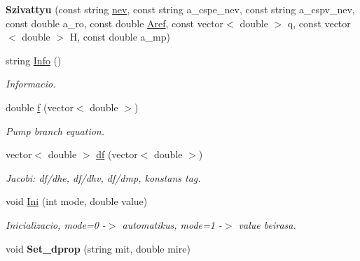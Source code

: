 \begin{DoxyCompactItemize}
\item 
\hypertarget{class_szivattyu_aea7d1a77b34e471145a856483915369f}{}\label{class_szivattyu_aea7d1a77b34e471145a856483915369f} 
{\bfseries Szivattyu} (const string \hyperlink{class_agelem_abe92b7e3912367d5d1caf6b277ca0b7d}{nev}, const string a\+\_\+cspe\+\_\+nev, const string a\+\_\+cspv\+\_\+nev, const double a\+\_\+ro, const double \hyperlink{class_agelem_a3f8668febc2958fd539997d537552f17}{Aref}, const vector$<$ double $>$ q, const vector$<$ double $>$ H, const double a\+\_\+mp)
\item 
\hypertarget{class_szivattyu_a369c5e45b9381265feeba29d06bd1e59}{}\label{class_szivattyu_a369c5e45b9381265feeba29d06bd1e59} 
string \hyperlink{class_szivattyu_a369c5e45b9381265feeba29d06bd1e59}{Info} ()
\begin{DoxyCompactList}\small\item\em Informacio. \end{DoxyCompactList}\item 
double \hyperlink{class_szivattyu_a083379e0cee2db17f1b20db3fdfcde79}{f} (vector$<$ double $>$)
\begin{DoxyCompactList}\small\item\em Pump branch equation. \end{DoxyCompactList}\item 
\hypertarget{class_szivattyu_aefd62e0f02d12273d34511e4b8721f04}{}\label{class_szivattyu_aefd62e0f02d12273d34511e4b8721f04} 
vector$<$ double $>$ \hyperlink{class_szivattyu_aefd62e0f02d12273d34511e4b8721f04}{df} (vector$<$ double $>$)
\begin{DoxyCompactList}\small\item\em Jacobi\+: df/dhe, df/dhv, df/dmp, konstans tag. \end{DoxyCompactList}\item 
\hypertarget{class_szivattyu_a3c35ef43a38a45e9d077281a8804abe4}{}\label{class_szivattyu_a3c35ef43a38a45e9d077281a8804abe4} 
void \hyperlink{class_szivattyu_a3c35ef43a38a45e9d077281a8804abe4}{Ini} (int mode, double value)
\begin{DoxyCompactList}\small\item\em Inicializacio, mode=0 -\/$>$ automatikus, mode=1 -\/$>$ value beirasa. \end{DoxyCompactList}\item 
\hypertarget{class_szivattyu_aae9b66e4fc0313360d1b8a65ba0a2a68}{}\label{class_szivattyu_aae9b66e4fc0313360d1b8a65ba0a2a68} 
void {\bfseries Set\+\_\+dprop} (string mit, double mire)

\end{DoxyCompactItemize}

